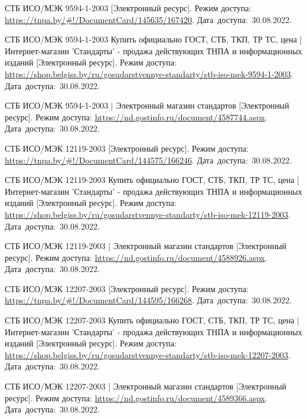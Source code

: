 \begin{thebibliography}{}
  СТБ ИСО/МЭК 9594-1-2003
  [Электронный ресурс].
  Режим доступа: \url{https://tnpa.by/#!/DocumentCard/145635/167420}.
  Дата~доступа:~30.08.2022.

  СТБ ИСО/МЭК 9594-1-2003 Купить официально ГОСТ, СТБ, ТКП, ТР ТС, цена | Интернет-магазин 'Стандарты' - продажа действующих ТНПА и информационных изданий
  [Электронный ресурс].
  Режим доступа: \url{https://shop.belgiss.by/ru/gosudarstvennye-standarty/stb-iso-mek-9594-1-2003}.
  Дата~доступа:~30.08.2022.

  СТБ ИСО/МЭК 9594-1-2003 | Электронный магазин стандартов
  [Электронный ресурс].
  Режим доступа: \url{https://nd.gostinfo.ru/document/4587744.aspx}.
  Дата~доступа:~30.08.2022.



  СТБ ИСО/МЭК 12119-2003
  [Электронный ресурс].
  Режим доступа: \url{https://tnpa.by/#!/DocumentCard/144575/166246}.
  Дата~доступа:~30.08.2022.

  СТБ ИСО/МЭК 12119-2003 Купить официально ГОСТ, СТБ, ТКП, ТР ТС, цена | Интернет-магазин 'Стандарты' - продажа действующих ТНПА и информационных изданий
  [Электронный ресурс].
  Режим доступа: \url{https://shop.belgiss.by/ru/gosudarstvennye-standarty/stb-iso-mek-12119-2003}.
  Дата~доступа:~30.08.2022.

  СТБ ИСО/МЭК 12119-2003 | Электронный магазин стандартов
  [Электронный ресурс].
  Режим доступа: \url{https://nd.gostinfo.ru/document/4588926.aspx}.
  Дата~доступа:~30.08.2022.



  СТБ ИСО/МЭК 12207-2003
  [Электронный ресурс].
  Режим доступа: \url{https://tnpa.by/#!/DocumentCard/144595/166268}.
  Дата~доступа:~30.08.2022.

  СТБ ИСО/МЭК 12207-2003 Купить официально ГОСТ, СТБ, ТКП, ТР ТС, цена | Интернет-магазин 'Стандарты' - продажа действующих ТНПА и информационных изданий
  [Электронный ресурс].
  Режим доступа: \url{https://shop.belgiss.by/ru/gosudarstvennye-standarty/stb-iso-mek-12207-2003}.
  Дата~доступа:~30.08.2022.

  СТБ ИСО/МЭК 12207-2003 | Электронный магазин стандартов
  [Электронный ресурс].
  Режим доступа: \url{https://nd.gostinfo.ru/document/4589366.aspx}.
  Дата~доступа:~30.08.2022.




\end{thebibliography}
